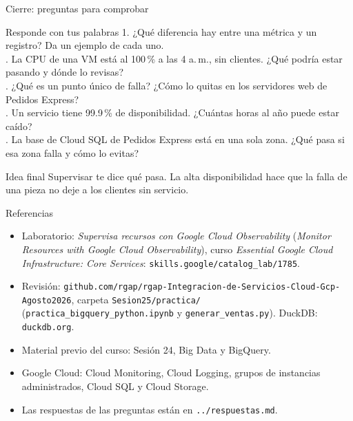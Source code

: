\documentclass[aspectratio=169,10pt,c]{beamer}
\begin{document}
\begin{frame}{Cierre: preguntas para comprobar}
\begin{block}{Responde con tus palabras}
\small
1. ¿Qué diferencia hay entre una métrica y un registro? Da un ejemplo de cada uno.\\. La CPU de una VM está al 100\,\% a las 4 a.\,m., sin clientes. ¿Qué podría estar pasando y dónde lo revisas?\\. ¿Qué es un punto único de falla? ¿Cómo lo quitas en los servidores web de Pedidos Express?\\. Un servicio tiene 99.9\,\% de disponibilidad. ¿Cuántas horas al año puede estar caído?\\. La base de Cloud SQL de Pedidos Express está en una sola zona. ¿Qué pasa si esa zona falla y cómo lo evitas?
\end{block}
\begin{alertblock}{Idea final}
\small Supervisar te dice qué pasa. La alta disponibilidad hace que la falla de una pieza no deje a los clientes sin servicio.
\end{alertblock}
\end{frame}

\begin{frame}{Referencias}
\scriptsize
\begin{itemize}\setlength\itemsep{4pt}
  \item Laboratorio: \textit{Supervisa recursos con Google Cloud Observability} (\textit{Monitor Resources with Google Cloud Observability}), curso \textit{Essential Google Cloud Infrastructure: Core Services}: \texttt{skills.google/catalog\_lab/1785}.
  \item Revisión: \texttt{github.com/rgap/rgap-Integracion-de-Servicios-Cloud-Gcp-Agosto2026}, carpeta \texttt{Sesion25/practica/} (\texttt{practica\_bigquery\_python.ipynb} y \texttt{generar\_ventas.py}). DuckDB: \texttt{duckdb.org}.
  \item Material previo del curso: Sesión 24, Big Data y BigQuery.
  \item Google Cloud: Cloud Monitoring, Cloud Logging, grupos de instancias administrados, Cloud SQL y Cloud Storage.
  \item Las respuestas de las preguntas están en \texttt{../respuestas.md}.
\end{itemize}
\end{frame}
\end{document}
